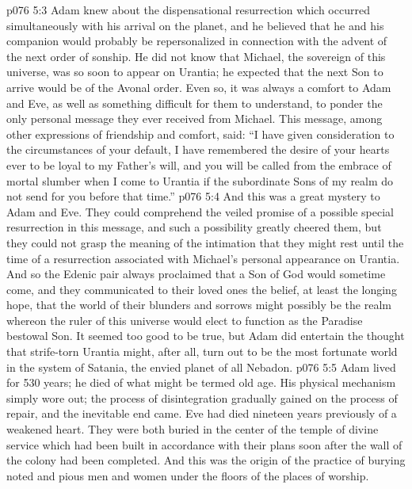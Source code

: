 \pc \vs p076 5:3 Adam knew about the dispensational resurrection which occurred simultaneously with his arrival on the planet, and he believed that he and his companion would probably be repersonalized in connection with the advent of the next order of sonship. He did not know that Michael, the sovereign of this universe, was so soon to appear on Urantia; he expected that the next Son to arrive would be of the Avonal order. Even so, it was always a comfort to Adam and Eve, as well as something difficult for them to understand, to ponder the only personal message they ever received from Michael. This message, among other expressions of friendship and comfort, said: “I have given consideration to the circumstances of your default, I have remembered the desire of your hearts ever to be loyal to my Father’s will, and you will be called from the embrace of mortal slumber when I come to Urantia if the subordinate Sons of my realm do not send for you before that time.”
\vs p076 5:4 And this was a great mystery to Adam and Eve. They could comprehend the veiled promise of a possible special resurrection in this message, and such a possibility greatly cheered them, but they could not grasp the meaning of the intimation that they might rest until the time of a resurrection associated with Michael’s personal appearance on Urantia. And so the Edenic pair always proclaimed that a Son of God would sometime come, and they communicated to their loved ones the belief, at least the longing hope, that the world of their blunders and sorrows might possibly be the realm whereon the ruler of this universe would elect to function as the Paradise bestowal Son. It seemed too good to be true, but Adam did entertain the thought that strife\hyp{}torn Urantia might, after all, turn out to be the most fortunate world in the system of Satania, the envied planet of all Nebadon.
\pc \vs p076 5:5 Adam lived for 530 years; he died of what might be termed old age. His physical mechanism simply wore out; the process of disintegration gradually gained on the process of repair, and the inevitable end came. Eve had died nineteen years previously of a weakened heart. They were both buried in the center of the temple of divine service which had been built in accordance with their plans soon after the wall of the colony had been completed. And this was the origin of the practice of burying noted and pious men and women under the floors of the places of worship.

